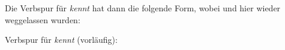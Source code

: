\noindent
Die Verbspur für \emph{kennt} hat dann die folgende Form, wobei \argst und \spr hier wieder
weggelassen wurden:

\eas
\label{le-verbspur-kennt-ohne-dsl}%
Verbspur für \emph{kennt} (vorläufig):\\\samepage
{}
\zs

